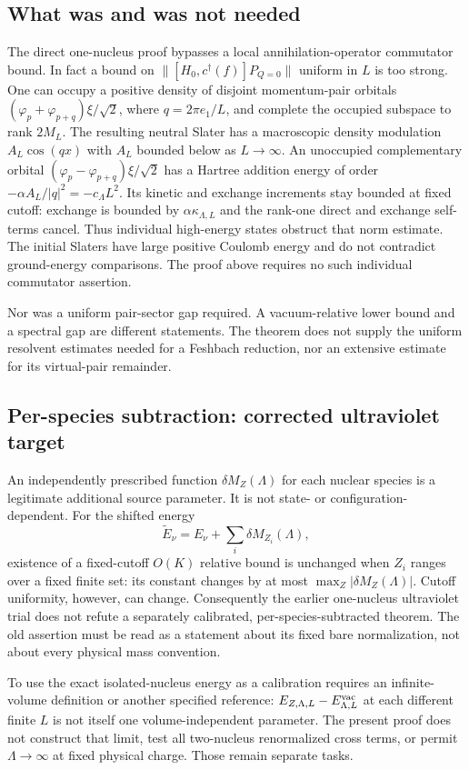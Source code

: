 \subsection{What was and was not needed}
The direct one-nucleus proof bypasses a local annihilation-operator
commutator bound. In fact a bound on
$\|[H_0,c^\dagger(f)]P_{Q=0}\|$ uniform in $L$ is too strong.
One can occupy a positive density of disjoint momentum-pair orbitals
$(\varphi_p+\varphi_{p+q})\xi/\sqrt2$, where $q=2\pi e_1/L$,
and complete the occupied subspace to rank $2M_L$.
The resulting neutral Slater has a macroscopic density modulation
$A_L\cos(qx)$ with $A_L$ bounded below as $L\to\infty$.
An unoccupied complementary orbital
$(\varphi_p-\varphi_{p+q})\xi/\sqrt2$ has a Hartree addition energy
of order $-\alpha A_L/|q|^2=-c_\Lambda L^2$.
Its kinetic and exchange increments stay bounded at fixed cutoff:
exchange is bounded by $\alpha\kappa_{\Lambda,L}$ and the rank-one
direct and exchange self-terms cancel.
Thus individual high-energy states obstruct that norm estimate.
The initial Slaters have large positive Coulomb energy and do not
contradict ground-energy comparisons. The proof above requires no
such individual commutator assertion.

Nor was a uniform pair-sector gap required. A vacuum-relative lower
bound and a spectral gap are different statements. The theorem does
not supply the uniform resolvent estimates needed for a Feshbach
reduction, nor an extensive estimate for its virtual-pair remainder.

\subsection{Per-species subtraction: corrected ultraviolet target}
An independently prescribed function $\delta M_Z(\Lambda)$ for each
nuclear species is a legitimate additional source parameter.
It is not state- or configuration-dependent.
For the shifted energy
\[
\widetilde E_\nu=E_\nu+\sum_i\delta M_{Z_i}(\Lambda),
\]
existence of a fixed-cutoff $O(K)$ relative bound is unchanged when
$Z_i$ ranges over a fixed finite set: its constant changes by at most
$\max_Z|\delta M_Z(\Lambda)|$. Cutoff uniformity, however, can change.
Consequently the earlier one-nucleus ultraviolet trial does not
refute a separately calibrated, per-species-subtracted theorem.
The old assertion must be read as a statement about its fixed bare
normalization, not about every physical mass convention.

To use the exact isolated-nucleus energy as a calibration requires
an infinite-volume definition or another specified reference:
$E_{Z,\Lambda,L}-E^{\mathrm{vac}}_{\Lambda,L}$ at each different finite $L$
is not itself one volume-independent parameter.
The present proof does not construct that limit, test all two-nucleus
renormalized cross terms, or permit $\Lambda\to\infty$ at fixed physical
charge. Those remain separate tasks.

